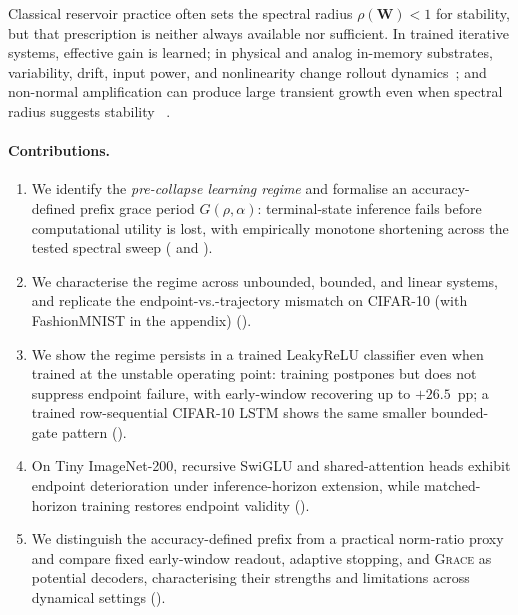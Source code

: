 \documentclass{article}
\theoremstyle{remark}
\newcommand{\bW}{\mathbf{W}}
\newcommand{\grace}{\textnormal{\textsc{Grace}}}
\begin{document}
Classical reservoir practice often sets the spectral radius $\rho(\bW)<1$ for
stability, but that prescription is neither always available nor sufficient.
In trained iterative systems, effective gain is learned; in physical and analog
in-memory substrates, variability, drift, input power, and nonlinearity change
rollout dynamics~\citep{leGallo2023mixed,wan2022compute,
rasch2024fast,momeni2025training}; and non-normal amplification can produce
large transient growth even when spectral radius suggests stability
~\citep{trefethen2005spectra,hennequin2012nonnormal,kerg2019nonnormal}.

\paragraph{Contributions.}
\begin{enumerate}
    \item We identify the \emph{pre-collapse learning regime} and formalise an
    accuracy-defined prefix grace period $G(\rho,\alpha)$: terminal-state
    inference fails before computational utility is lost, with empirically
    monotone shortening across the tested spectral sweep
    ( and ).
    \item We characterise the regime across unbounded, bounded, and linear
    systems, and replicate the
    endpoint-vs.-trajectory mismatch on CIFAR-10 (with FashionMNIST in the appendix)
    ().
    \item We show the regime persists in a trained LeakyReLU classifier even
    when trained at the unstable operating point: training postpones but does
    not suppress endpoint failure, with early-window recovering up to
    $+26.5$~pp; a trained row-sequential CIFAR-10 LSTM shows the same smaller
    bounded-gate pattern ().
    \item On Tiny ImageNet-200, recursive SwiGLU and shared-attention heads
    exhibit endpoint deterioration under inference-horizon extension, while
    matched-horizon training restores endpoint validity
    ().
    \item We distinguish the accuracy-defined prefix from a practical
    norm-ratio proxy and compare fixed early-window readout, adaptive
    stopping, and \grace{} as potential decoders, characterising their
    strengths and limitations across dynamical settings
    ().
\end{enumerate}
\end{document}
